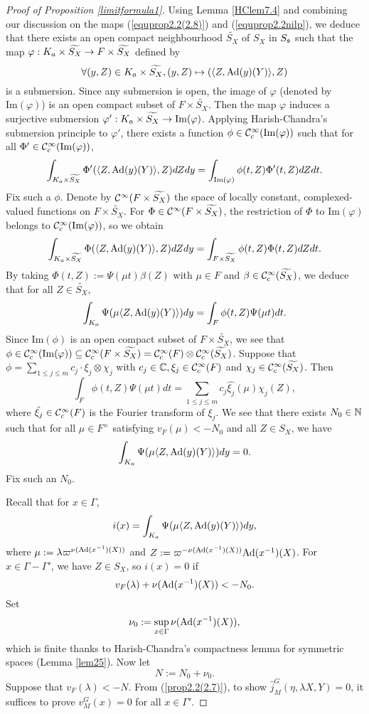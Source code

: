 \documentclass[a4paper]{amsart}
\renewcommand{\Im}{{\mathrm{Im}}}                    \newcommand{\Ind}{{\mathrm{Ind}}}             \newcommand{\Isom}{{\mathrm{Isom}}}
\newcommand{\wt}{\widetilde}                        \newcommand{\wh}{\widehat}                      \newcommand{\wpair}[1]{\left\{{#1}\right\}}
\theoremstyle{definition}
\theoremstyle{remark}
\numberwithin{equation}{subsection}
\begin{document}
\begin{proof}[Proof of Proposition \ref{limitformula1}]
Using Lemma \ref{HClem7.4} and combining our discussion on the maps (\ref{equprop2.2(2.8)}) and (\ref{equprop2.2nilp}), we deduce that there exists an open compact neighbourhood $\wt{S_X}$ of $S_X$ in $S_{\mathfrak{s}}$ such that the map $\varphi: K_a\times \wt{S_X}\ra F\times \wt{S_X}$ defined by
$$ \forall (y,Z)\in K_a\times \wt{S_X}, (y,Z)\mapsto (\langle Z,\Ad(y)(Y) \rangle, Z) $$
is a submersion. Since any submersion is open, the image of $\varphi$ (denoted by $\Im(\varphi)$) is an open compact subset of $F\times \wt{S_X}$. 
Then the map $\varphi$ induces a surjective submersion $\varphi': K_a\times \wt{S_X}\ra \Im(\varphi)$. 
Applying Harish-Chandra's submersion principle \cite[Theorem 11]{MR0414797} to $\varphi'$, there exists a function $\phi\in\CC_c^\infty(\Im(\varphi))$ such that for all $\Phi'\in\CC_c^\infty(\Im(\varphi))$, 
$$ \int_{K_a\times\wt{S_X}} \Phi'(\langle Z,\Ad(y)(Y) \rangle, Z) dZdy=\int_{\Im(\varphi)} \phi(t,Z)\Phi'(t, Z) dZdt. $$
Fix such a $\phi$. Denote by $\CC^\infty(F\times \wt{S_X})$ the space of locally constant, complexed-valued functions on $F\times \wt{S_X}$. For $\Phi\in\CC^\infty(F\times \wt{S_X})$, the restriction of $\Phi$ to $\Im(\varphi)$ belongs to $\CC_c^\infty(\Im(\varphi))$, so we obtain
$$ \int_{K_a\times\wt{S_X}} \Phi(\langle Z,\Ad(y)(Y) \rangle, Z) dZdy=\int_{F\times \wt{S_X}} \phi(t,Z)\Phi(t, Z) dZdt. $$
By taking $\Phi(t,Z):=\Psi(\mu t)\beta(Z)$ with $\mu\in F$ and $\beta\in\CC_c^\infty(\wt{S_X})$, we deduce that for all $Z\in\wt{S_X}$, 
$$ \int_{K_a} \Psi(\mu \langle Z,{\mathrm{Ad}}(y)(Y) \rangle) dy=\int_F \phi(t,Z)\Psi(\mu t) dt. $$
Since $\Im(\phi)$ is an open compact subset of $F\times \wt{S_X}$, we see that $\phi\in\CC_c^\infty(\Im(\varphi))\subseteq\CC_c^\infty(F\times \wt{S_X})=\CC_c^\infty(F)\otimes\CC_c^\infty(\wt{S_X})$. Suppose that $\phi=\sum\limits_{1\leq j\leq m} c_j\cdot\xi_j\otimes\chi_j$ with $c_j\in {\mathbb {C}}, \xi_j\in{\mathcal {C}}_c^\infty(F)$ and $\chi_j\in\CC_c^\infty(\wt{S_X})$. Then
$$ \int_F \phi(t,Z)\Psi(\mu t) dt=\sum_{1\leq j\leq m}c_j \hat{\xi_j}(\mu)\chi_j(Z), $$
where $\hat{\xi_j}\in{\mathcal {C}}_c^\infty(F)$ is the Fourier transform of $\xi_j$. We see that there exists $N_0\in{\mathbb {N}}$ such that for all $\mu\in F^\times$ satisfying $v_F(\mu)<-N_0$ and all $Z\in S_X$, we have
$$ \int_{K_a} \Psi(\mu \langle Z,{\mathrm{Ad}}(y)(Y) \rangle) dy=0. $$
Fix such an $N_0$. 

Recall that for $x\in\Gamma$, 
$$ i(x)=\int_{K_a} \Psi(\mu \langle Z,{\mathrm{Ad}}(y)(Y) \rangle) dy, $$
where $\mu:=\lambda\varpi^{\nu({\mathrm{Ad}}(x^{-1})(X))}$ and $Z:=\varpi^{-\nu({\mathrm{Ad}}(x^{-1})(X))}{\mathrm{Ad}}(x^{-1})(X)$. For $x\in\Gamma-\Gamma'$, we have $Z\in S_X$, so $i(x)=0$ if
$$ v_F(\lambda)+\nu({\mathrm{Ad}}(x^{-1})(X))<-N_0. $$
Set
$$ \nu_0:=\sup_{x\in\Gamma} \nu({\mathrm{Ad}}(x^{-1})(X)), $$
which is finite thanks to Harish-Chandra's compactness lemma for symmetric spaces (Lemma \ref{lem25}). Now let
$$ N:=N_0+\nu_0. $$
Suppose that $v_F(\lambda)<-N$. From (\ref{prop2.2(2.7)}), to show $\hat{j}_M^G(\eta, \lambda X, Y)=0$, it suffices to prove $v_M^G(x)=0$ for all $x\in\Gamma'$. 


\end{proof}
\end{document}
